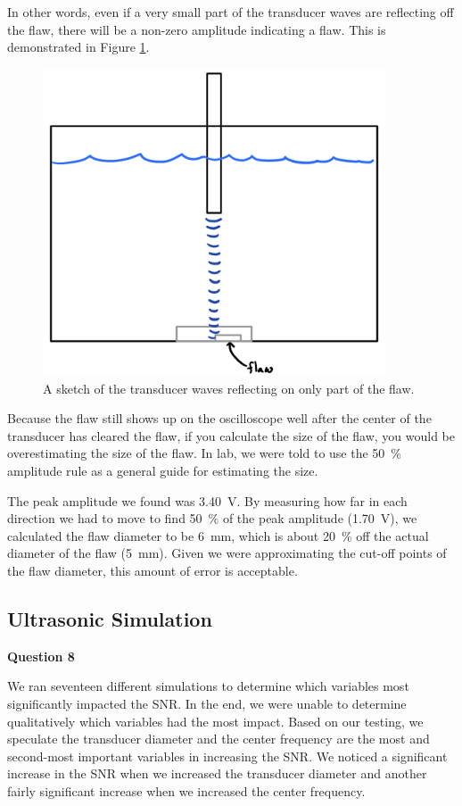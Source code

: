 \documentclass[12 pt]{report}
\begin{document}
In other words, even if a very small part of the transducer waves are reflecting off the flaw, there will be a non-zero amplitude indicating a flaw. This is demonstrated in Figure \ref{fig:flaw_detection}.

\begin{figure}[htbp]
	\centering
	\includegraphics[width=4in]{images/flaw_detection_sketch}
	\caption{A sketch of the transducer waves reflecting on only part of the flaw.}
	\label{fig:flaw_detection}
\end{figure}

Because the flaw still shows up on the oscilloscope well after the center of the transducer has cleared the flaw, if you calculate the size of the flaw, you would be overestimating the size of the flaw. In lab, we were told to use the \qty{50}{\percent} amplitude rule as a general guide for estimating the size.

The peak amplitude we found was \qty{3.40}{\volt}. By measuring how far in each direction we had to move to find \qty{50}{\percent} of the peak amplitude (\qty{1.70}{\volt}), we calculated the flaw diameter to be \qty{6}{\mm}, which is about \qty{20}{\percent} off the actual diameter of the flaw (\qty{5}{\mm}). Given we were approximating the cut-off points of the flaw diameter, this amount of error is acceptable.

\subsection{Ultrasonic Simulation} \label{ultrasonic_simulation}
\textbf{Question 8}

We ran seventeen different simulations to determine which variables most significantly impacted the SNR. In the end, we were unable to determine qualitatively which variables had the most impact. Based on our testing, we speculate the transducer diameter and the center frequency are the most and second-most important variables in increasing the SNR. We noticed a significant increase in the SNR when we increased the transducer diameter and another fairly significant increase when we increased the center frequency.
\end{document}
